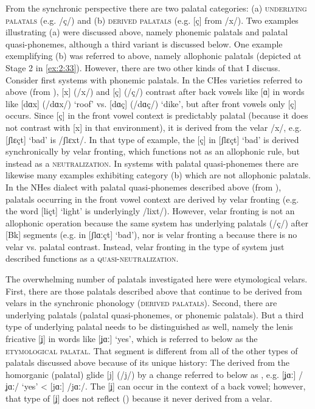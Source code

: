 \begin{xlist}
\begin{xlist}
From the synchronic perspective there are two palatal categories: (a) \textsc{underlying} \textsc{palatals} (e.g. /ç/) and (b) \textsc{derived} \textsc{palatals} (e.g. [ç] from /x/). Two examples illustrating (a) were discussed above, namely phonemic palatals and palatal quasi-phonemes, although a third variant is discussed below. One example exemplifying (b) was referred to above, namely allophonic palatals (depicted at Stage 2 in \ref{ex:2:33}). However, there are two other kinds of  that I discuss. Consider first systems with phonemic palatals. In the CHes varieties referred to above (from ), [x] (/x/) and [ç] (/ç/) contrast after back vowels like [ɑ] in words like [dɑx] (/dɑx/) ‘roof’ vs. [dɑç] (/dɑç/) ‘dike’, but after front vowels only [ç] occurs. Since [ç] in the front vowel context is predictably palatal (because it does not contrast with [x] in that environment), it is derived from the velar /x/, e.g. [ʃlɛçt] ‘bad’ is /ʃlɛxt/. In that type of example, the [ç] in [ʃlɛçt] ‘bad’ is derived synchronically by velar fronting, which functions not as an allophonic rule, but instead as a \textsc{neutralization}. In systems with palatal quasi-phonemes there are likewise many examples exhibiting category (b) which are not allophonic palatals. In the NHes dialect with palatal quasi-phonemes described above (from ), palatals occurring in the front vowel context are derived by velar fronting (e.g. the word [liçt] ‘light’ is underlyingly /lixt/). However, velar fronting is not an allophonic operation because the same system has underlying palatals (/ç/) after [Bk] segments (e.g. in [ʃlɑːçt] ‘bad’), nor is velar fronting a  because there is no velar vs. palatal contrast. Instead, velar fronting in the type of system just described functions as a \textsc{quasi-neutralization}.

The overwhelming number of palatals investigated here were etymological velars. First, there are those palatals described above that continue to be derived from velars in the synchronic phonology (\textsc{derived} \textsc{palatals}). Second, there are underlying palatals (palatal quasi-phonemes, or phonemic palatals). But a third type of underlying palatal needs to be distinguished as well, namely the lenis fricative [ʝ] in words like [ʝɑː] ‘yes’, which is referred to below as the \textsc{etymological} \textsc{palatal}. That segment is different from all of the other types of palatals discussed above because of its unique history: The  derived from the homorganic (palatal) glide [j] (/j/) by a change referred to below as , e.g. [ʝɑː] /ʝɑː/ ‘yes’ < [jɑː] /jɑː/. The  [ʝ] can occur in the context of a back vowel; however, that type of [ʝ] does not reflect  () because it never derived from a velar.


\end{xlist}
\end{xlist}
